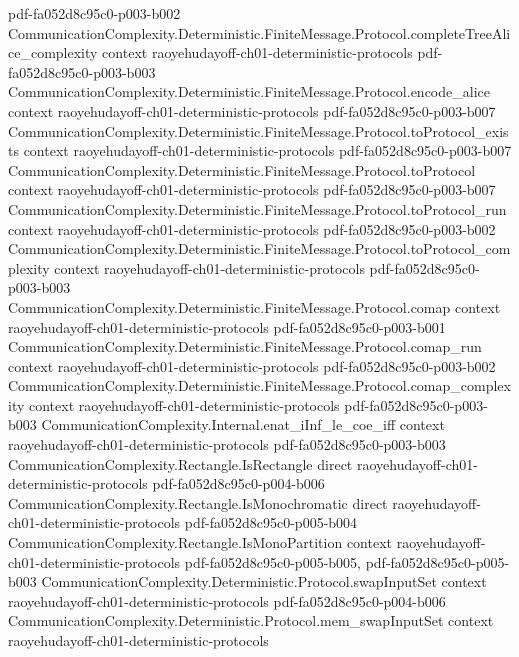 \begin{theorem}
  {pdf-fa052d8c95c0-p003-b002}
\proofstep
  {CommunicationComplexity.Deterministic.FiniteMessage.Protocol.completeTreeAlice_complexity}
  {context}
  {raoyehudayoff-ch01-deterministic-protocols}
  {pdf-fa052d8c95c0-p003-b003}
\proofstep
  {CommunicationComplexity.Deterministic.FiniteMessage.Protocol.encode_alice}
  {context}
  {raoyehudayoff-ch01-deterministic-protocols}
  {pdf-fa052d8c95c0-p003-b007}
\proofstep
  {CommunicationComplexity.Deterministic.FiniteMessage.Protocol.toProtocol_exists}
  {context}
  {raoyehudayoff-ch01-deterministic-protocols}
  {pdf-fa052d8c95c0-p003-b007}
\proofstep
  {CommunicationComplexity.Deterministic.FiniteMessage.Protocol.toProtocol}
  {context}
  {raoyehudayoff-ch01-deterministic-protocols}
  {pdf-fa052d8c95c0-p003-b007}
\proofstep
  {CommunicationComplexity.Deterministic.FiniteMessage.Protocol.toProtocol_run}
  {context}
  {raoyehudayoff-ch01-deterministic-protocols}
  {pdf-fa052d8c95c0-p003-b002}
\proofstep
  {CommunicationComplexity.Deterministic.FiniteMessage.Protocol.toProtocol_complexity}
  {context}
  {raoyehudayoff-ch01-deterministic-protocols}
  {pdf-fa052d8c95c0-p003-b003}
\proofstep
  {CommunicationComplexity.Deterministic.FiniteMessage.Protocol.comap}
  {context}
  {raoyehudayoff-ch01-deterministic-protocols}
  {pdf-fa052d8c95c0-p003-b001}
\proofstep
  {CommunicationComplexity.Deterministic.FiniteMessage.Protocol.comap_run}
  {context}
  {raoyehudayoff-ch01-deterministic-protocols}
  {pdf-fa052d8c95c0-p003-b002}
\proofstep
  {CommunicationComplexity.Deterministic.FiniteMessage.Protocol.comap_complexity}
  {context}
  {raoyehudayoff-ch01-deterministic-protocols}
  {pdf-fa052d8c95c0-p003-b003}
\proofstep
  {CommunicationComplexity.Internal.enat_iInf_le_coe_iff}
  {context}
  {raoyehudayoff-ch01-deterministic-protocols}
  {pdf-fa052d8c95c0-p003-b003}
\proofstep
  {CommunicationComplexity.Rectangle.IsRectangle}
  {direct}
  {raoyehudayoff-ch01-deterministic-protocols}
  {pdf-fa052d8c95c0-p004-b006}
\proofstep
  {CommunicationComplexity.Rectangle.IsMonochromatic}
  {direct}
  {raoyehudayoff-ch01-deterministic-protocols}
  {pdf-fa052d8c95c0-p005-b004}
\proofstep
  {CommunicationComplexity.Rectangle.IsMonoPartition}
  {context}
  {raoyehudayoff-ch01-deterministic-protocols}
  {pdf-fa052d8c95c0-p005-b005,
    pdf-fa052d8c95c0-p005-b003}
\proofstep
  {CommunicationComplexity.Deterministic.Protocol.swapInputSet}
  {context}
  {raoyehudayoff-ch01-deterministic-protocols}
  {pdf-fa052d8c95c0-p004-b006}
\proofstep
  {CommunicationComplexity.Deterministic.Protocol.mem_swapInputSet}
  {context}
  {raoyehudayoff-ch01-deterministic-protocols}

\end{theorem}
